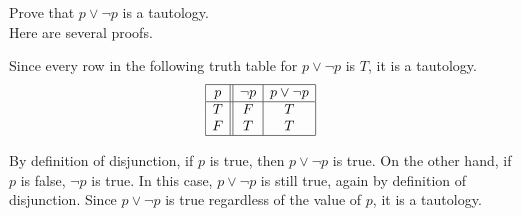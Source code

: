 \begin{exa}
Prove that $p\vee \neg p$ is a tautology.\\
Here are several proofs.
\begin{pfenum}
\item
Since every row in the following truth table for $p\vee \neg p$ is $T$, it is a tautology.
$$\begin{array}{|c||c|c|c|}
\hline
p&\neg p&p\vee \neg p\\
\hline
T&F&T\\
F&T&T\\
\hline
\end{array}$$
\item
By definition of disjunction, if $p$ is true, then $p\vee \neg p$ is true.  On the other hand, if
$p$ is false, $\neg p$ is true.  In this case, $p\vee \neg p$ is still true,
again by definition of disjunction.
Since $p\vee \neg p$ is true regardless of the value of $p$, it is a tautology. 
\end{pfenum}
\end{exa}

